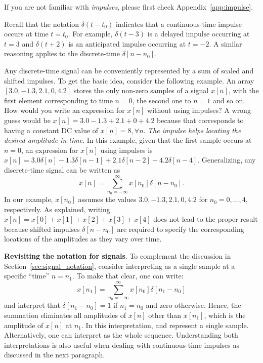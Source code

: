 If you are not familiar with \emph{impulses}, please first check Appendix~\ref{app:impulse}.

Recall that the notation $\delta(t-t_0)$ indicates that a continuous-time impulse occurs at time $t=t_0$. 
For example, $\delta(t-3)$ is a delayed impulse occurring at $t=3$ and $\delta(t+2)$ is an anticipated impulse occurring at $t=-2$.
A similar reasoning applies to the discrete-time $\delta[n-n_0]$.

Any discrete-time signal can be conveniently represented by a sum of scaled and shifted impulses. To get the basic idea, consider the following example. An array $[3.0, -1.3, 2.1, 0, 4.2]$ stores the only non-zero samples of a signal $x[n]$, with the first element corresponding to time $n=0$, the second one to $n=1$ and so on. How would you write an expression for $x[n]$ without using impulses? A wrong guess would be $x[n]=3.0 -1.3 + 2.1 + 0 + 4.2$ because that corresponds to having a constant DC value of $x[n]=8, \forall n$. \emph{The impulse helps locating the desired amplitude in time}. In this example, given that the first sample occurs at $n=0$, an expression for $x[n]$ using impulses is $x[n]=3.0 \delta[n] -1.3\delta[n-1] + 2.1\delta[n-2]  + 4.2\delta[n-4]$. Generalizing, any discrete-time signal can be written as
\begin{equation}
x[n] = \sum_{n_0=-\infty}^\infty x[n_0]\delta[n-n_0].	
	\label{eq:impulses}
\end{equation}
In our example, $x[n_0]$ assumes the values $3.0, -1.3, 2.1, 0, 4.2$ for $n_0=0,\ldots,4$, respectively. As explained, writing $x[n]=x[0] + x[1] + x[2] + x[3] + x[4]$ does not lead to the proper result because shifted impulses $\delta[n-n_0]$ are required to specify the corresponding locations of the amplitudes as they vary over time.

\bExample \textbf{Revisiting the notation for signals}.
To complement the discussion in Section~\ref{sec:signal_notation}, consider 
interpreting  as a single sample at a specific ``time'' $n=n_1$. To make that clear, one can write:
\begin{equation}
x[n_1] = \sum_{n_0=-\infty}^\infty x[n_0]\delta[n_1-n_0]
\label{eq:impulses2}
\end{equation}
and interpret that $\delta[n_1-n_0]=1$ if $n_1=n_0$ and zero otherwise. Hence, the summation eliminates all amplitudes of $x[n]$ other than $x[n_1]$, which is the amplitude of $x[n]$ at $n_1$. 
In this interpretation,  and  represent a single sample.
Alternatively, one can interpret  as the whole sequence.
Understanding both interpretations is also useful when dealing with continuous-time impulses as discussed in the next paragraph.
\eExample 

